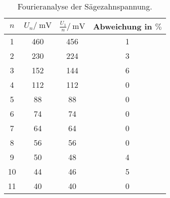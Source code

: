 \begin{table}
	\centering
	\begin{tabular}{S[table-format=2.0] S[table-format=3.0] S[table-format=3.1] S[table-format=1.0] }
	\toprule
	{$n$} & {$U_n/\:\si{\milli\volt}$} & {$\frac{U_1}{n}/\:\si{\milli\volt}$} & {Abweichung in $\%$}\\
	 & 460 & 456 & 1\\
 2 & 230 & 224 & 3\\
 3 & 152 & 144 & 6\\
 4 & 112 & 112 & 0\\
 5 &  88 &  88 & 0\\
 6 &  74 &  74 & 0\\
 7 &  64 &  64 & 0\\
 8 &  56 &  56 & 0\\
 9 &  50 &  48 & 4\\
10 &  44 &  46 & 5\\
11 &  40 &  40 & 0\\
	\bottomrule
	\end{tabular}
	\caption{Fourieranalyse der Sägezahnspannung.}
	\label{tab:FA_RE}
\end{table}


